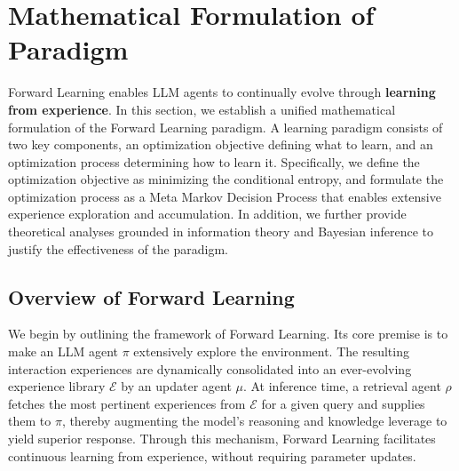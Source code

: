 \documentclass{article}
\newcommand{\method}{Forward Learning}
\begin{document}
\section{Mathematical Formulation of Paradigm}
\method{} enables LLM agents to continually evolve through \textbf{learning from experience}. 
In this section, we establish a unified mathematical formulation of the \method{} paradigm. 
A learning paradigm consists of two key components, an optimization objective defining what to learn, and an optimization process determining how to learn it. 
Specifically, we define the optimization objective as minimizing the conditional entropy, and formulate the optimization process as a Meta Markov Decision Process that enables extensive experience exploration and accumulation. 
In addition, we further provide theoretical analyses grounded in information theory and Bayesian inference to justify the effectiveness of the paradigm.

\subsection{Overview of \method{}}
We begin by outlining the framework of \method{}.
Its core premise is to make an LLM agent $\pi$ extensively explore the environment. The resulting interaction experiences are dynamically consolidated into an ever-evolving experience library $\mathcal{E}$ by an updater agent $\mu$. 
At inference time, a retrieval agent $\rho$ fetches the most pertinent experiences from $\mathcal{E}$ for a given query and supplies them to $\pi$, thereby augmenting the model's reasoning and knowledge leverage to yield superior response. Through this mechanism, \method{} facilitates continuous learning from experience, without requiring parameter updates.
\end{document}
